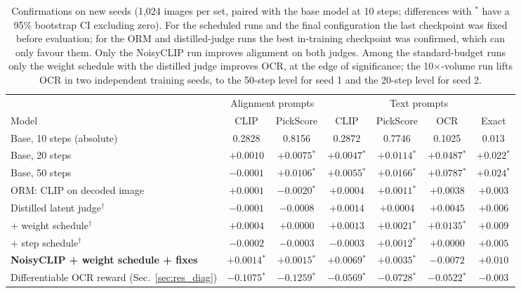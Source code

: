 \documentclass{article}
\newcommand{\sig}{$^{*}$}
\begin{document}
\begin{table}[t]
  \caption{Confirmations on new seeds (1{,}024 images per set, paired with the base model at 10 steps; differences with
  $^{*}$ have a 95\% bootstrap CI excluding zero). For the scheduled runs and the final configuration the last checkpoint
  was fixed before evaluation; for the ORM and distilled-judge runs the best in-training checkpoint was confirmed, which can
  only favour them. Only the
  NoisyCLIP run improves alignment on both judges. Among the standard-budget runs only the weight schedule with the distilled
  judge improves OCR, at the edge of significance; the 10$\times$-volume run lifts OCR in two independent training seeds, to
  the 50-step level for seed 1 and the 20-step level for seed 2.}
  \label{tab:main}
  \centering
  \small
  \setlength{\tabcolsep}{4pt}
  \begin{tabular}{lcccccc}
    \toprule
    & \multicolumn{2}{c}{Alignment prompts} & \multicolumn{4}{c}{Text prompts} \\
    \cmidrule(r){2-3}\cmidrule(l){4-7}
    Model & CLIP & PickScore & CLIP & PickScore & OCR & Exact \\
    \midrule
    Base, 10 steps (absolute)  & 0.2828 & 0.8156 & 0.2872 & 0.7746 & 0.1025 & 0.013 \\
    Base, 20 steps             & $+0.0010$ & $+0.0075$\sig & $+0.0047$\sig & $+0.0114$\sig & $+0.0487$\sig & $+0.022$\sig \\
    Base, 50 steps             & $-0.0001$ & $+0.0106$\sig & $+0.0055$\sig & $+0.0166$\sig & $+0.0787$\sig & $+0.024$\sig \\
    \midrule
    ORM: CLIP on decoded image & $+0.0001$ & $-0.0020$\sig & $+0.0004$ & $+0.0011$\sig & $+0.0038$ & $+0.003$ \\
    Distilled latent judge$^{\dagger}$  & $-0.0001$ & $-0.0008$ & $+0.0014$ & $+0.0004$ & $+0.0045$ & $+0.006$ \\
    \quad + weight schedule$^{\dagger}$ & $+0.0004$ & $+0.0000$ & $+0.0013$ & $+0.0021$\sig & $+0.0135$\sig & $+0.009$ \\
    \quad + step schedule$^{\dagger}$   & $-0.0002$ & $-0.0003$ & $-0.0003$ & $+0.0012$\sig & $+0.0000$ & $+0.005$ \\
    \textbf{NoisyCLIP + weight schedule + fixes} & $\mathbf{+0.0014}$\sig & $\mathbf{+0.0015}$\sig & $\mathbf{+0.0069}$\sig &
      $\mathbf{+0.0035}$\sig & $-0.0072$ & $+0.010$ \\
    \midrule
    Differentiable OCR reward (Sec.~\ref{sec:res_diag}) & $-0.1075$\sig & $-0.1259$\sig & $-0.0569$\sig & $-0.0728$\sig & $-0.0522$\sig & $-0.003$ \\

\end{tabular}
\end{table}
\end{document}
